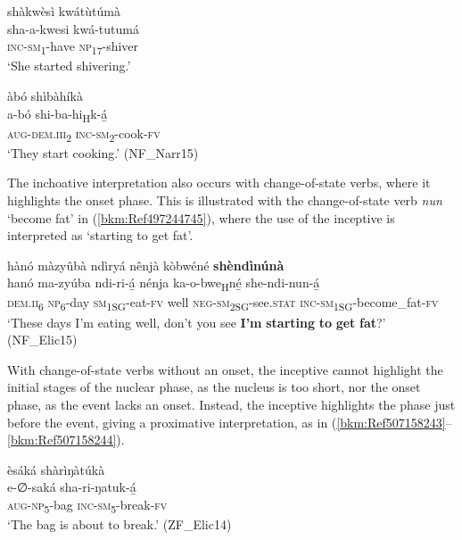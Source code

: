 \ea
\label{bkm:Ref497244502}
shàkwèsì kwátùtúmà\\
\gll sha-a-kwesi    kwá-tutumá\\
\textsc{inc}-\textsc{sm}\textsubscript{1}-have  \textsc{np}\textsubscript{17}-shiver\\
\glt ‘She started shivering.’
\z

\largerpage
\ea
\label{bkm:Ref497244503}
àbó shìbàhíkà\\
\gll a-bó    shi-ba-hi\textsubscript{H}k-á̲\\
\textsc{aug}-\textsc{dem}.\textsc{iii}\textsubscript{2}  \textsc{inc}-\textsc{sm}\textsubscript{2}-cook-\textsc{fv}\\
\glt ‘They start cooking.’ (NF\_Narr15)
\z

The inchoative interpretation also occurs with change-of-state verbs, where it highlights the onset phase. This is illustrated with the change-of-state verb \textit{nun} ‘become fat’ in (\ref{bkm:Ref497244745}), where the use of the inceptive is interpreted as ‘starting to get fat’.

\ea
\label{bkm:Ref497244745}
hànó màzyûbà ndìryá nênjà kòbwéné \textbf{shèndìnúnà}\\
\gll hanó    ma-zyúba  ndi-ri-á̲  nénja ka-o-bwe\textsubscript{H}né̲  she-ndi-nun-á̲ \\
\textsc{dem}.\textsc{ii}\textsubscript{6}  \textsc{np}\textsubscript{6}-day  \textsc{sm}\textsubscript{1SG}-eat-\textsc{fv}  well
\textsc{neg}-\textsc{sm}\textsubscript{2SG}-see.\textsc{stat}  \textsc{inc}-\textsc{sm}\textsubscript{1SG}-become\_fat-\textsc{fv}\\
\glt ‘These days I’m eating well, don’t you see \textbf{I’m} \textbf{starting} \textbf{to} \textbf{get} \textbf{fat}?’ (NF\_Elic15)
\z

With change-of-state verbs without an onset, the inceptive cannot highlight the initial stages of the nuclear phase, as the nucleus is too short, nor the onset phase, as the event lacks an onset. Instead, the inceptive highlights the phase just before the event, giving a proximative interpretation, as in (\ref{bkm:Ref507158243}--\ref{bkm:Ref507158244}).

\ea
\label{bkm:Ref507158243}
èsáká shàrìŋàtúkà\\
\gll e-∅-saká    sha-ri-ŋatuk-á̲\\
\textsc{aug}-\textsc{np}\textsubscript{5}-bag  \textsc{inc}-\textsc{sm}\textsubscript{5}-break-\textsc{fv}\\
\glt ‘The bag is about to break.’ (ZF\_Elic14)
\z

